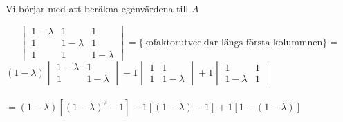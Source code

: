 \documentclass[../../main.tex]{subfiles}
\begin{document}
\begin{solution}{13}

Vi börjar med att beräkna egenvärdena till $A$

$$
\begin{vmatrix}
    1 - \lambda & 1 & 1\\
    1 & 1 - \lambda & 1 \\
    1 & 1 & 1 - \lambda
\end{vmatrix} = \{\text{kofaktorutvecklar längs första kolummnen}\} = $$
$
(1 - \lambda) \begin{vmatrix}
    1 - \lambda & 1\\
    1 & 1 - \lambda
\end{vmatrix} - 1\begin{vmatrix}
    1 & 1\\
    1 & 1 - \lambda
\end{vmatrix} + 
1\begin{vmatrix}
    1 & 1\\
    1 - \lambda & 1
\end{vmatrix}$
\\\\
$ 
= (1 - \lambda)[(1 - \lambda)^2 - 1] - 1[(1- \lambda) - 1] + 1[1 - (1 - \lambda)]
$

\end{solution}
\end{document}
